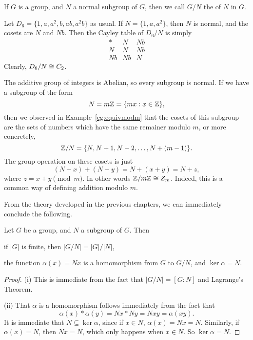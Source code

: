 \begin{definition}
  If $G$ is a group, and $N$ a normal subgroup of $G$, then we call $G/N$ the 
   of $N$ in $G$.  
\end{definition}

\begin{example}
  Let $D_{6} = \{1, a, a^{2}, b, ab, a^{2}b\}$ as usual.  If $N = 
  \{1, a, a^{2}\}$, then $N$ is normal, and the cosets are $N$ and 
  $Nb$.  Then the Cayley table of $D_{6}/N$ is simply
  \[
    \begin{array}{c|cc}
      \ast & N & Nb \\
      \hline
      N & N & Nb \\
      Nb & Nb & N
    \end{array}
  \]
  Clearly, $D_{6}/N \cong C_{2}$.
\end{example}

\begin{example}
  The additive group of integers is Abelian, so every subgroup is 
  normal.  If we have a subgroup of the form
  \[
    N = m\mathbb{Z} = \{mx : x \in \mathbb{Z} \},
  \]
  then we observed in Example~\ref{eg:equivmodm} that the cosets of 
  this subgroup are the sets of numbers which have the same remainer 
  modulo $m$, or more concretely,
  \[
    \mathbb{Z}/N = \{N, N + 1, N + 2, \ldots, N + (m-1)\}.
  \]
  The group operation on these cosets is just
  \[
    (N + x) + (N + y) = N + (x+y) = N + z,
  \]
  where $z = x + y \pmod{m}$.  In other words $\mathbb{Z}/m\mathbb{Z} 
  \cong Z_{m}$.  Indeed, this is a common way of defining addition modulo 
  $m$.
\end{example}

From the theory developed in the previous chapters, we can 
immediately conclude the following.

\begin{proposition}
  Let $G$ be a group, and $N$ a subgroup of $G$.  Then
  \begin{theoremenum}
    \item if $|G|$ is finite, then $|G/N| = |G|/|N|$,
    \item the function $\alpha(x) = Nx$ is a homomorphism from $G$ 
    to $G/N$, and $\ker \alpha = N$.
  \end{theoremenum}
\end{proposition}
\begin{proof}
  (i) This is immediate from the fact that $|G/N| = [G : N]$ and 
  Lagrange's Theorem.
  
  (ii) That $\alpha$ is a homomorphism follows immediately from the 
  fact that
  \[
    \alpha(x) \ast \alpha(y) = Nx \ast Ny = Nxy = \alpha(xy).
  \]
  It is immediate that $N \subseteq \ker \alpha$, since if $x \in 
  N$, $\alpha(x) = Nx = N$.  Similarly, if $\alpha(x) = N$, then 
  $Nx = N$, which only happens when $x \in N$. So $\ker \alpha = N$.
\end{proof}

